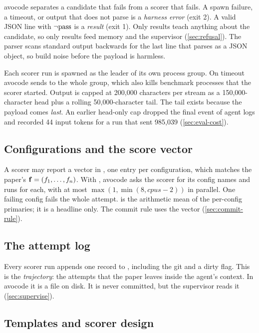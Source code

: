 avocode separates a candidate that fails from a scorer that fails. A spawn failure, a timeout, or
output that does not parse is a \emph{harness error} (exit 2). A valid JSON line with
$\neg\mathrm{pass}$ is a \emph{result} (exit 1). Only results teach anything about the candidate, so only
results feed memory and the supervisor (\cref{sec:refusal}). The parser scans standard output
backwards for the last line that parses as a JSON object, so build noise before the payload is
harmless.

Each scorer run is spawned as the leader of its own process group. On timeout avocode sends
 to the whole group, which also kills benchmark processes that the scorer started.
Output is capped at 200{,}000 characters per stream as a 150{,}000-character head plus a rolling
50{,}000-character tail. The tail exists because the payload comes \emph{last}. An earlier
head-only cap dropped the final event of agent logs and recorded 44 input tokens for a run that sent
985{,}039 (\cref{sec:eval-cost}).

\subsection{Configurations and the score vector}

A scorer may report a vector in , one entry per configuration, which matches the
paper's $\mathbf{f} = (f_1, \ldots, f_n)$. With , avocode asks the scorer for its config
names and runs  for each, with at most
$\max(1, \min(8, \mathit{cpus} - 2))$ in parallel. One failing config fails the whole attempt.
 is the arithmetic mean of the per-config primaries; it is a headline only. The commit
rule uses the vector (\cref{sec:commit-rule}).

\subsection{The attempt log}

Every scorer run appends one record to , including the git
 and a dirty flag. This is the \emph{trajectory}: the attempts that the paper leaves
inside the agent's context. In avocode it is a file on disk. It is never committed, but the
supervisor reads it (\cref{sec:supervise}).

\subsection{Templates and scorer design}

